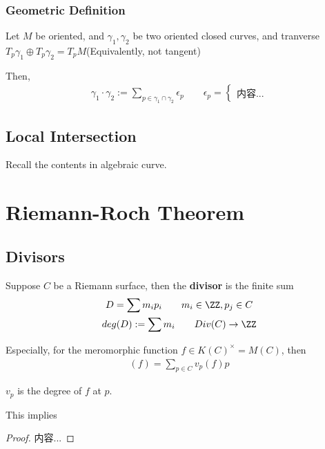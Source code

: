 \documentclass[Total.tex]{subfiles}
\begin{document}
				\subsubsection{Geometric Definition}
				\begin{Def}
					Let $M$ be oriented, and $\gamma_1,\gamma_2$ be two oriented closed curves, and tranverse $T_p \gamma_1\oplus T_p \gamma_2=T_p M$(Equivalently, not tangent)
					
					Then,
					\begin{gather*}
						\gamma_1\cdot \gamma_2:=\sum_{p\in \gamma_1\cap\gamma_2} \epsilon_p\qquad \epsilon_p=\begin{cases}
							内容...
						\end{cases}
					\end{gather*}
				\end{Def}
				
			\subsection{Local Intersection}
				Recall the contents in algebraic curve.
		\section{Riemann-Roch Theorem}
			\subsection{Divisors}
				\begin{Def}
					Suppose $C$ be a Riemann surface, then the \textbf{divisor} is the finite sum
					\begin{gather*}
						D=\sum m_ip_i\qquad m_i\in \ZZ,p_j\in C\\
						deg(D):=\sum m_i\qquad Div(C)\rightarrow \ZZ
					\end{gather*}
					
					Especially, for the meromorphic function $f\in K(C)^\times=M(C)$, then
					\begin{gather*}
						(f)=\sum_{p\in C} v_p(f)p
					\end{gather*}
					
					$v_p$ is the degree of $f$ at $p$. 
				\end{Def}
				
				This implies
				\begin{proposition}
					
				\end{proposition}
				\begin{proof}
					内容...
				\end{proof}
				
\end{document}

